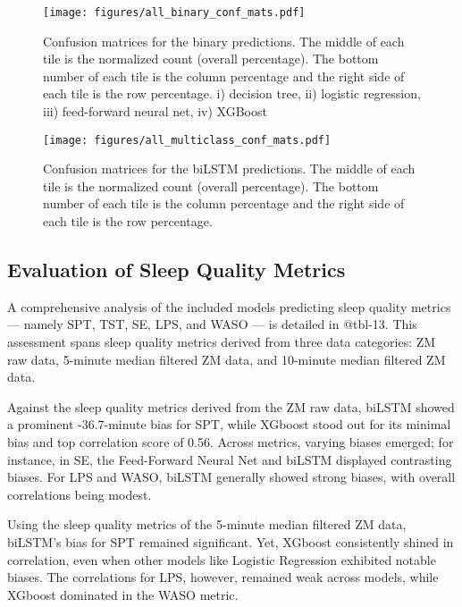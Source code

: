 \documentclass[
  10pt,
]{scrbook}
\begin{document}
\begin{figure}

{\centering \texttt{[image: figures/all\_binary\_conf\_mats.pdf]}

}

\caption{\label{fig-bin_conf_mat}Confusion matrices for the binary
predictions. The middle of each tile is the normalized count (overall
percentage). The bottom number of each tile is the column percentage and
the right side of each tile is the row percentage. i) decision tree, ii)
logistic regression, iii) feed-forward neural net, iv) XGBoost}

\end{figure}

\begin{figure}

{\centering \texttt{[image: figures/all\_multiclass\_conf\_mats.pdf]}

}

\caption{\label{fig-mul_conf_mat}Confusion matrices for the biLSTM
predictions. The middle of each tile is the normalized count (overall
percentage). The bottom number of each tile is the column percentage and
the right side of each tile is the row percentage.}

\end{figure}

\hypertarget{evaluation-of-sleep-quality-metrics}{%
\subsection{Evaluation of Sleep Quality
Metrics}\label{evaluation-of-sleep-quality-metrics}}

A comprehensive analysis of the included models predicting sleep quality
metrics --- namely SPT, TST, SE, LPS, and WASO --- is detailed in
@tbl-13. This assessment spans sleep quality metrics derived from three
data categories: ZM raw data, 5-minute median filtered ZM data, and
10-minute median filtered ZM data.

Against the sleep quality metrics derived from the ZM raw data, biLSTM
showed a prominent -36.7-minute bias for SPT, while XGboost stood out
for its minimal bias and top correlation score of 0.56. Across metrics,
varying biases emerged; for instance, in SE, the Feed-Forward Neural Net
and biLSTM displayed contrasting biases. For LPS and WASO, biLSTM
generally showed strong biases, with overall correlations being modest.

Using the sleep quality metrics of the 5-minute median filtered ZM data,
biLSTM's bias for SPT remained significant. Yet, XGboost consistently
shined in correlation, even when other models like Logistic Regression
exhibited notable biases. The correlations for LPS, however, remained
weak across models, while XGboost dominated in the WASO metric.
\end{document}
